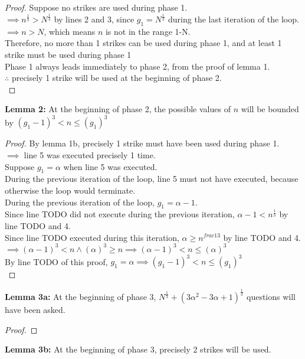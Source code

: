 \begin{problem}
\begin{proof}
    Suppose no strikes are used during phase 1. \\
    $\implies n^{\frac{1}{3}} > N^{\frac{1}{3}}$ by lines 2 and 3, since $g_1 = N^{\frac{1}{3}}$ during the last iteration of the loop. \\
    $\implies n > N$, which means $n$ is not in the range 1-N. \\
    Therefore, no more than 1 strikes can be used during phase 1, and at least 1 strike must be used during phase 1 \\
    Phase 1 always leads immediately to phase 2, from the proof of lemma 1. \\
    $\therefore $ precisely 1 strike will be used at the beginning of phase 2. \\
  \end{proof}
  \textbf{Lemma 2:} At the beginning of phase 2, the possible values of $n$ will be bounded by $(g_1 - 1)^3 < n \leq (g_1)^3$ \\
  \begin{proof}
    By lemma 1b, precisely 1 strike must have been used during phase 1. \\
    $\implies $ line 5 was executed precisely 1 time. \\
    Suppose $g_1 = \alpha$ when line 5 was executed. \\
    During the previous iteration of the loop, line 5 must not have executed, because otherwise the loop would terminate. \\
    During the previous iteration of the loop, $g_1 = \alpha - 1$. \\
    Since line TODO did not execute during the previous iteration, $\alpha - 1 < n^{\frac{1}{3}}$ by line TODO and 4. \\
    Since line TODO executed during this iteration, $\alpha \geq n^{frac{1}{3}}$ by line TODO and 4. \\
    $\implies (\alpha - 1)^3 < n \land (\alpha)^3 \geq n \implies (\alpha - 1)^3 < n \leq (\alpha)^3$ \\
    By line TODO of this proof, $g_1 = \alpha \implies (g_1 - 1)^3 < n \leq (g_1)^3$ \\
  \end{proof}
  \textbf{Lemma 3a:} At the beginning of phase 3, $N^{\frac{1}{3}} + (3\alpha^2 - 3\alpha + 1)^{\frac{1}{3}}$ questions will have been asked. \\
  \begin{proof}
  \end{proof}
  \textbf{Lemma 3b:} At the beginning of phase 3, precisely 2 strikes will be used. \\

\end{problem}
